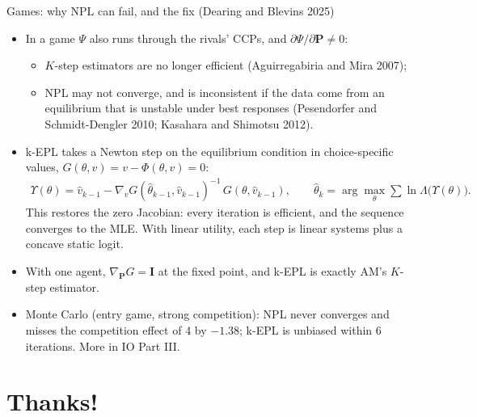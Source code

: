 \documentclass[aspectratio=169,11pt]{beamer}
\begin{document}
\begin{frame}{Games: why NPL can fail, and the fix (Dearing and Blevins 2025)}
\small
\begin{itemize}
\item In a game $\Psi$ also runs through the rivals' CCPs, and $\partial \Psi / \partial \symbf P \neq 0$:
\begin{itemize}
\item $K$-step estimators are no longer efficient (Aguirregabiria and Mira 2007);
\item NPL may not converge, and is inconsistent if the data come from an equilibrium that is unstable under best responses (Pesendorfer and Schmidt-Dengler 2010; Kasahara and Shimotsu 2012).
\end{itemize}
\item k-EPL takes a Newton step on the equilibrium condition in choice-specific values, $G(\theta, v) = v - \Phi(\theta, v) = 0$:
\begin{align*}
\Upsilon(\theta) = \hat v_{k-1} - \nabla_v G(\hat\theta_{k-1}, \hat v_{k-1})^{-1}\, G(\theta, \hat v_{k-1}), \qquad \hat\theta_k = \arg\max_\theta \textstyle\sum \ln \Lambda\big(\Upsilon(\theta)\big).
\end{align*}
This restores the zero Jacobian: every iteration is efficient, and the sequence converges to the MLE. With linear utility, each step is linear systems plus a concave static logit.
\item With one agent, $\nabla_{\symbf P} G = \symbf I$ at the fixed point, and k-EPL is exactly AM's $K$-step estimator.
\item Monte Carlo (entry game, strong competition): NPL never converges and misses the competition effect of 4 by $-1.38$; k-EPL is unbiased within 6 iterations. More in IO Part III.
\end{itemize}
\end{frame}

\section{Thanks!}
\end{document}
